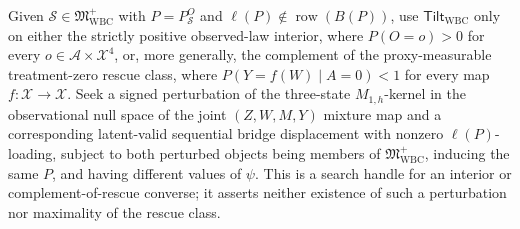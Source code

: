Given \(\mathcal S\in\mathfrak M_{\mathrm{WBC}}^{+}\) with \(P=P_{\mathcal S}^O\) and \(\ell(P)\notin\operatorname{row}(B(P))\), use \(\mathsf{Tilt}_{\mathrm{WBC}}\) only on either the strictly positive observed-law interior, where \(P(O=o)>0\) for every \(o\in\mathcal A\times\mathcal X^4\), or, more generally, the complement of the proxy-measurable treatment-zero rescue class, where \(P(Y=f(W)\mid A=0)<1\) for every map \(f:\mathcal X\to\mathcal X\). Seek a signed perturbation of the three-state \(M_{1,h}\)-kernel in the observational null space of the joint \((Z,W,M,Y)\) mixture map and a corresponding latent-valid sequential bridge displacement with nonzero \(\ell(P)\)-loading, subject to both perturbed objects being members of \(\mathfrak M_{\mathrm{WBC}}^{+}\), inducing the same \(P\), and having different values of \(\psi\). This is a search handle for an interior or complement-of-rescue converse; it asserts neither existence of such a perturbation nor maximality of the rescue class.